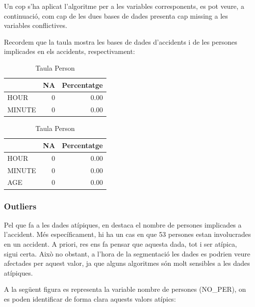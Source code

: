\documentclass[11pt,longbibliography]{article}
\theoremstyle{definition}
\theoremstyle{remark}
\begin{document}
Un cop s'ha aplicat l'algoritme per a les variables corresponents, es pot veure, a continuació, com cap de les dues bases de dades presenta cap missing a les variables conflictives.


Recordem que la taula mostra les bases de dades d'accidents i de les persones implicades en els accidents, respectivament:

\begin{table}[H]
\parbox{.45\linewidth}{
\centering
\begin{tabular}{l|r|r|}
\cline{2-3}
\textbf{} & \multicolumn{1}{l|}{\textbf{NA}} & \multicolumn{1}{l|}{\textbf{Percentatge}} \\ \hline
\multicolumn{1}{|l|}{HOUR}        & 0 & 0.00 \\ \hline
\multicolumn{1}{|l|}{MINUTE}      & 0 & 0.00 \\ \hline
\end{tabular}
\caption{Taula Accident}
}
\hfill
\parbox{.45\linewidth}{
\centering
\begin{tabular}{l|r|r|}
\cline{2-3}
\textbf{} & \multicolumn{1}{l|}{\textbf{NA}} & \multicolumn{1}{l|}{\textbf{Percentatge}} \\ \hline
\multicolumn{1}{|l|}{HOUR}        & 0  & 0.00 \\ \hline
\multicolumn{1}{|l|}{MINUTE}      & 0 & 0.00 \\ \hline
\multicolumn{1}{|l|}{AGE}         & 0 & 0.00 \\ \hline
\end{tabular}
\caption{Taula Person}
}
\end{table}

\subsubsection{Outliers}

Pel que fa a les dades atípiques, en destaca el nombre de persones implicades a l'accident. Més específicament, hi ha un cas en que 53 persones estan involucrades en un accident. A priori, res ens fa pensar que aquesta dada, tot i ser atípica, sigui certa. Això no obstant, a l'hora de la segmentació les dades es podrien veure afectades per aquest valor, ja que alguns algoritmes són molt sensibles a les dades atípiques.

A la següent figura es representa la variable nombre de persones (NO\_PER), on es poden identificar de forma clara aquests valors atípics:
\end{document}
